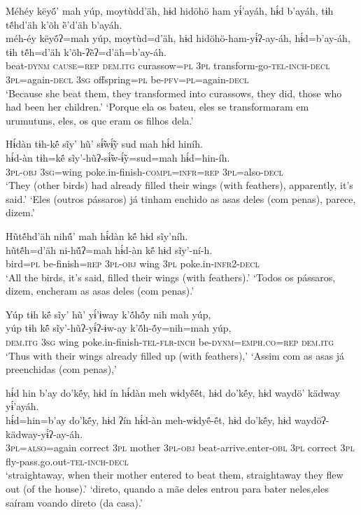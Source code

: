 \documentclass[output=paper,
modfonts,nonflat
]{langsci/langscibook}
\begin{document}
\ea  Méhéy këyö́’ mah yúp, moytùdd’äh, hɨd hidöhö ham yɨ́’ayáh, hɨ́d b’ayáh, tɨh tẽ́hd’äh k’õh ë̀’d’äh b’ayáh.\\
\gll méh-éy këyö́ʔ=mah yúp, moytùd=d’äh, hɨd hidöhö-ham-yɨ́ʔ-ay-áh, hɨ́d=b’ay-áh, tɨh tẽ́h=d’äh k’õh-ʔë̀ʔ=d’äh=b’ay-áh.\\
     beat\textsc{-dynm} \textsc{cause=rep} \textsc{dem.itg} curassow\textsc{=pl} \textsc{3pl} transform-go\textsc{-tel-inch-decl} \textsc{3pl}=again\textsc{-decl} \textsc{3sg} offspring\textsc{=pl} be\textsc{-pfv=pl}=again\textsc{-decl}\\
\glt ‘Because she beat them, they transformed into curassows, they did, those who had been her children.'
\glt ‘Porque ela os bateu, eles se transformaram em urumutuns, eles, os que eram os filhos dela.'
\z

\ea  Hɨ́dàn tɨh-kë́ sĩy’ hũ’ sɨ̃́wɨ̃́y sud mah hɨ́d hiníh.\\
\gll hɨ́d-àn tɨh=kë́ sĩy’-hũʔ-sɨ̃́w-ɨ̃́y=sud=mah hɨ́d=hin-íh.\\
     \textsc{3pl-obj} \textsc{3sg=}wing poke.in-finish\textsc{-compl=infr=rep} \textsc{3pl}=also-\textsc{decl}\\
\glt ‘They (other birds) had already filled their wings (with feathers), apparently, it’s said.'
\glt ‘Eles (outros pássaros) já tinham enchido as asas deles (com penas), parece, dizem.'
\z

\ea  Hũtẽ́hd’äh nihṹ’ mah hɨ́dàn kë́ hɨd sĩy’níh.\\
\gll hũtẽ́h=d’äh ni-hṹʔ=mah hɨ́d-àn kë́ hɨd sĩy’-ní-h.\\
     bird\textsc{=pl} be-finish\textsc{=rep} \textsc{3pl-obj} wing \textsc{3pl} poke.in\textsc{-infr2-decl}\\
\glt ‘All the birds, it’s said, filled their wings (with feathers).'
\glt ‘Todos os pássaros, dizem, encheram as asas deles (com penas).'
\z

\newpage
\ea  Yúp tɨh kë́ sĩy’ hũ’ yɨ́’ɨway k’ṍhṍy nih mah yúp,\\
\gll yúp tɨh kë́ sĩy’-hũʔ-yɨ́ʔ-ɨw-ay k’ṍh-ṍy=nih=mah yúp,\\
     \textsc{dem.itg} \textsc{3sg} wing poke.in-finish\textsc{-tel-flr-inch} be\textsc{-dynm=emph.co=rep} \textsc{dem.itg}\\
\glt ‘Thus with their wings already filled up (with feathers),'
\glt ‘Assim com as asas já preenchidas (com penas),'
\z

\ea  hɨ́d hin b’ay do’kë́y, hɨd ín hɨ́dàn meh wɨdyë́ë́t, hɨd do’kë́y, hɨd waydö’ kädway yɨ́’ayáh.\\
\gll hɨ́d=hin=b’ay do’kë́y, hɨd ʔín hɨ́d-àn meh-wɨdyë́-ë́t, hɨd do’kë́y, hɨd waydöʔ-kädway-yɨ́ʔ-ay-áh.\\
     \textsc{3pl}=\textsc{also}=again correct \textsc{3pl} mother \textsc{3pl-obj} beat-arrive.enter\textsc{-obl} \textsc{3pl} correct \textsc{3pl} fly-pass.go.out\textsc{-tel-inch-decl}\\
\glt ‘straightaway, when their mother entered to beat them, straightaway they flew out (of the house).'
\glt ‘direto, quando a mãe deles entrou para bater neles,eles saíram voando direto (da casa).'
\z
\end{document}

